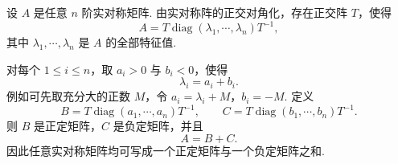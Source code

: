 \begin{solution}
	设 $A$ 是任意 $n$ 阶实对称矩阵. 由实对称阵的正交对角化，存在正交阵 $T$，使得
	\[
	A=T\operatorname{diag}(\lambda_1,\cdots,\lambda_n)T^{-1},
	\]
	其中 $\lambda_1,\cdots,\lambda_n$ 是 $A$ 的全部特征值.
	
	对每个 $1\le i\le n$，取 $a_i>0$ 与 $b_i<0$，使得
	\[
	\lambda_i=a_i+b_i.
	\]
	例如可先取充分大的正数 $M$，令 $a_i=\lambda_i+M$，$b_i=-M$.
	定义
	\[
	B=T\operatorname{diag}(a_1,\cdots,a_n)T^{-1},
	\qquad
	C=T\operatorname{diag}(b_1,\cdots,b_n)T^{-1}.
	\]
	则 $B$ 是正定矩阵，$C$ 是负定矩阵，并且
	\[
	A=B+C.
	\]
	因此任意实对称矩阵均可写成一个正定矩阵与一个负定矩阵之和.
\end{solution}




































































